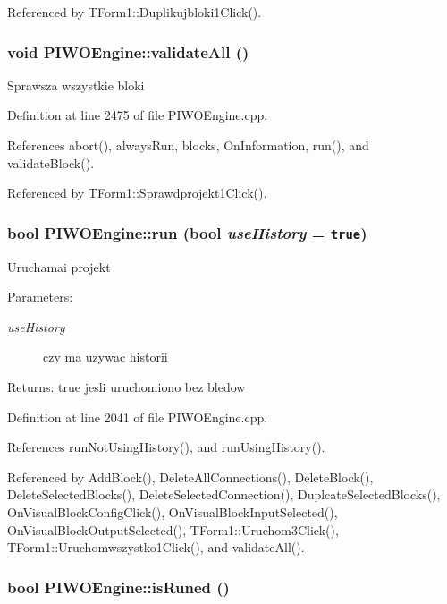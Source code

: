 Referenced by TForm1::Duplikujbloki1Click().\hypertarget{classPIWOEngine_3585d1f4c45df99a02c36af9cab8e343}{
\subsubsection[validateAll]{\setlength{\rightskip}{0pt plus 5cm}void PIWOEngine::validateAll ()}}
\label{classPIWOEngine_3585d1f4c45df99a02c36af9cab8e343}


Sprawsza wszystkie bloki 

Definition at line 2475 of file PIWOEngine.cpp.

References abort(), alwaysRun, blocks, OnInformation, run(), and validateBlock().

Referenced by TForm1::Sprawdprojekt1Click().\hypertarget{classPIWOEngine_d20139057c6b68e8e4e2fb0d0e04926b}{
\subsubsection[run]{\setlength{\rightskip}{0pt plus 5cm}bool PIWOEngine::run (bool {\em useHistory} = {\tt true})}}
\label{classPIWOEngine_d20139057c6b68e8e4e2fb0d0e04926b}


Uruchamai projekt \begin{Desc}
\item[Parameters:]
\begin{description}
\item[{\em useHistory}]czy ma uzywac historii \end{description}
\end{Desc}
\begin{Desc}
\item[Returns:]true jesli uruchomiono bez bledow \end{Desc}


Definition at line 2041 of file PIWOEngine.cpp.

References runNotUsingHistory(), and runUsingHistory().

Referenced by AddBlock(), DeleteAllConnections(), DeleteBlock(), DeleteSelectedBlocks(), DeleteSelectedConnection(), DuplcateSelectedBlocks(), OnVisualBlockConfigClick(), OnVisualBlockInputSelected(), OnVisualBlockOutputSelected(), TForm1::Uruchom3Click(), TForm1::Uruchomwszystko1Click(), and validateAll().\hypertarget{classPIWOEngine_b8cd8305728eb8998011af59677084ad}{
\subsubsection[isRuned]{\setlength{\rightskip}{0pt plus 5cm}bool PIWOEngine::isRuned ()}}
\label{classPIWOEngine_b8cd8305728eb8998011af59677084ad}


